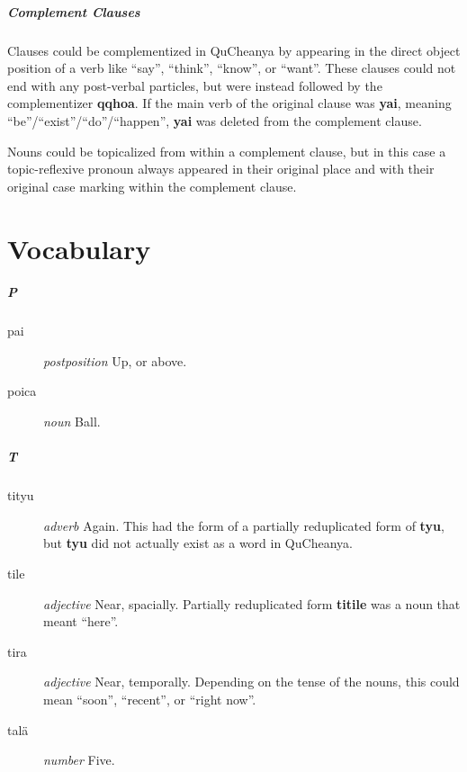 \documentclass{article}
\begin{document}
\subsubsection{Complement Clauses}

Clauses could be complementized in QuCheanya by appearing in the direct object position of a verb like ``say'', ``think'', ``know'', or ``want''.  These clauses could not end with any post-verbal particles, but were instead followed by the complementizer \textbf{qqhoa}.  If the main verb of the original clause was \textbf{yai}, meaning ``be''/``exist''/``do''/``happen'', \textbf{yai} was deleted from the complement clause.

Nouns could be topicalized from within a complement clause, but in this case a topic-reflexive pronoun always appeared in their original place and with their original case marking within the complement clause.

\part{Vocabulary}

\subsubsection{P}

\begin{description}
\item [pai] \emph{postposition} Up, or above.
\item [poica] \emph{noun} Ball.
\end{description}

\subsubsection{T}

\begin{description}
\item [tityu] \emph{adverb} Again.  This had the form of a partially reduplicated form of \textbf{tyu}, but \textbf{tyu} did not actually exist as a word in QuCheanya.
\item [tile] \emph{adjective} Near, spacially.  Partially reduplicated form \textbf{titile} was a noun that meant ``here''.
\item [tira] \emph{adjective} Near, temporally.  Depending on the tense of the nouns, this could mean ``soon'', ``recent'', or ``right now''.
\item [tal\"a] \emph{number} Five.
\end{description}
\end{document}
